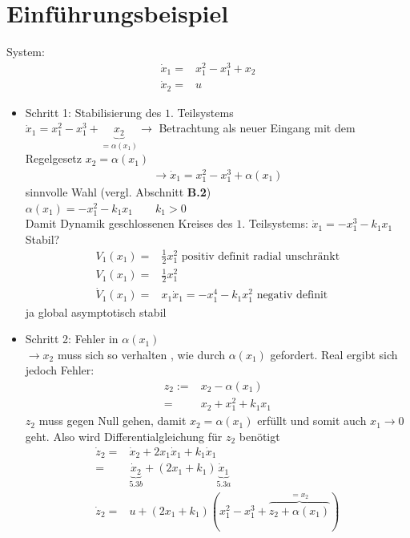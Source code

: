 \documentclass[ngerman]{tudscrreprt}
\begin{document}
\section{Einführungsbeispiel}
System: \begin{align}\dot x_1 =& x_1^2 - x_1^3 + x_2 \tag{5.3a}\\
\dot x_2 = & u \tag{5.3b}
\end{align}
\begin{itemize}
\item Schritt 1: Stabilisierung des $1.$ Teilsystems\\
$\dot x_1 = x_1^2 - x_1^3 + \underbrace{x_2}_{ = \alpha(x_1)} \rightarrow$ Betrachtung als neuer Eingang mit dem Regelgesetz $x_2 = \alpha(x_1)$
\begin{align}
\rightarrow \dot x_1 = x_1^2 - x_1^3 + \alpha(x_1) \tag{5.4}
\end{align}
sinnvolle Wahl (vergl. Abschnitt \textbf{B.2})\\
$\alpha(x_1) = -x_1^2 - k_1x_1 \qquad k_1 > 0$\\
Damit Dynamik  geschlossenen Kreises des $1.$ Teilsystems: $\dot x_1 = -x_1^3 - k_1x_1$\\
Stabil? \begin{align*}V_1(x_1) =& \frac{1}{2} x_1^2 \text{ positiv definit radial unschränkt}\\
V_1(x_1) = & \frac{1}{2} x_1^2 \\
\dot V_1(x_1) =& x_1\dot x_1 = -x_1^4 - k_1 x_1^2 \text{ negativ definit } 
\end{align*}
ja global asymptotisch stabil
\item Schritt 2: Fehler in $\alpha(x_1)$\\
$\rightarrow x_2$ muss sich so verhalten , wie durch $\alpha(x_1)$ gefordert. Real ergibt sich jedoch Fehler: \begin{align*}z_2:= &x_2 - \alpha(x_1)\\
=& x_2 + x_1^2 + k_1 x_1
\end{align*} 
$z_2 $ muss gegen Null gehen, damit $x_2 = \alpha(x_1)$ erfüllt und somit auch $x_1 \to 0$ geht. Also wird Differentialgleichung für $z_2$ benötigt 
\begin{align*}
\dot z_2 = &\dot x_2 + 2x_1 \dot x_1 + k_1 \dot x_1\\
=&\underbrace{\dot x_2}_{5.3b} + (2 x_1 + k_1) \underbrace{\dot x_1}_{5.3a}\\
\dot z_2 = & u + (2x_1 + k_1)(x_1^2 - x_1^3 + \overbrace{z_2 + \alpha(x_1)}^{= x_2}) \\

\end{align*}
\end{itemize}
\end{document}
